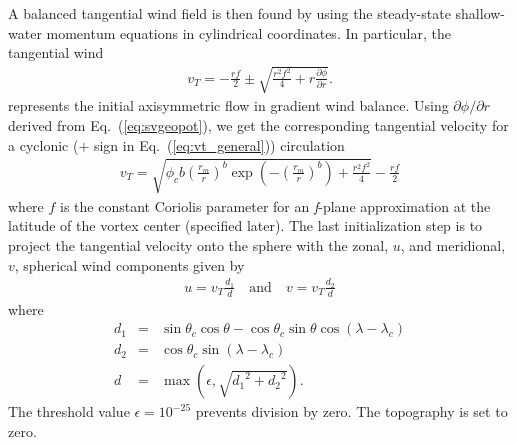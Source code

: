 A balanced tangential wind field is then found by using the
steady-state shallow-water momentum equations in cylindrical coordinates.  In particular, 
the tangential wind
\begin{eqnarray}
    v_T = -\frac{r f}{2} \pm \sqrt{\frac{r^2 f^2}{4}+r\frac{\partial
    \phi}{\partial r}}. 
    \label{eq:vt_general}
\end{eqnarray}
represents the initial axisymmetric flow in gradient wind balance.
Using $\partial \phi / \partial r$ derived from Eq.~(\ref{eq:svgeopot}), we get the corresponding tangential velocity for a cyclonic ($+$ sign in Eq.~(\ref{eq:vt_general})) circulation
\begin{eqnarray}
    \label{eq:symvortTv} v_T = \sqrt{\phi_c b \left(\frac{r_m}{r}\right)^b
    \exp\left(-\left(\frac{r_m}{r}\right)^b\right) + \frac{r^2 f^2}{4}}
    - \frac{r f}{2}
\end{eqnarray}
where $f$ is the constant Coriolis parameter for an \emph{f}-plane
approximation at the latitude of the vortex center (specified later).
The last initialization step is to project the tangential velocity onto the sphere with the zonal, $u$,
and meridional, $v$, spherical wind components given by
\begin{eqnarray}
    \label{eq:symvoruv} u = v_T\frac{d_1}{d} \quad\mathrm{and}\quad v =
    v_T\frac{d_2}{d}
\end{eqnarray}
where
\begin{eqnarray}
    d_1 & = & \sin\theta_c \cos\theta - \cos\theta_c \sin\theta\cos\left
    (\lambda - \lambda_c\right) \\
    d_2 & = & \cos\theta_c \sin\left(\lambda - \lambda_c\right) \\
    d & = & \max\left(\epsilon, \sqrt{{d_1}^2+{d_2}^2}\right).
\end{eqnarray}
The threshold value $\epsilon=10^{-25}$ prevents division by zero. The topography is set to zero. 

